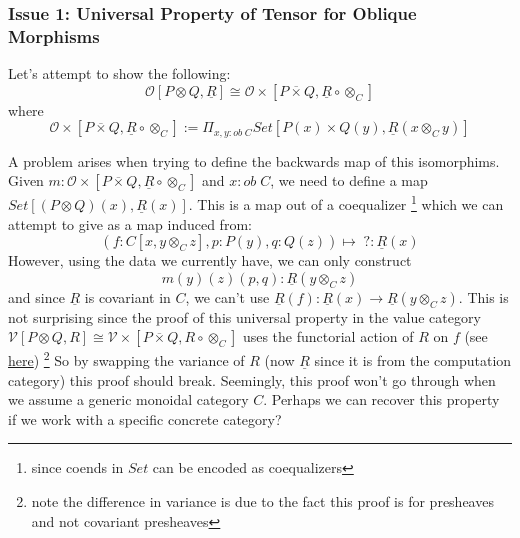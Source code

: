 \documentclass{article}
\begin{document}
\subsubsection{Issue 1: Universal Property of Tensor for Oblique Morphisms}
Let's attempt to show the following:
\[
  \mathcal{O}[P \otimes Q , \underline{R}] \cong \mathcal{O\times}[P \overline{\times} Q , \underline{R} \circ \otimes_C]  
\]
where 
\[
    \mathcal{O\times}[P \overline{\times} Q , \underline{R} \circ \otimes_C] 
    := \Pi_{x , y : ob \;C}Set[P(x)\times Q(y) , \underline{R}(x \otimes_C y)]
\]

A problem arises when trying to define the backwards map of this isomorphims. 
Given $m : \mathcal{O\times}[P \overline{\times} Q , \underline{R} \circ \otimes_C]$ and $x : ob \; C$, we need to define a map
$Set[(P \otimes Q)(x), \underline{R}(x)]$. This is a map out of a coequalizer 
\footnote{since coends in $Set$ can be encoded as coequalizers}
which we can attempt to give as a map induced from:
\[
    (f : C[x , y\otimes_C z] , p : P(y) , q : Q(z)) \mapsto \;? : \underline{R}(x)
\]
However, using the data we currently have, we can only construct
\[
    m(y)(z)(p,q) : \underline{R} (y \otimes_C z)    
\]
and since $\underline{R}$ is covariant in $C$, we can't use $\underline{R}(f) : \underline{R}(x) \rightarrow \underline{R}(y \otimes_C z)$.
This is not surprising since the proof of this universal property in the value category 
$\mathcal{V}[P \otimes Q , R] \cong \mathcal{V\times}[P \overline{\times} Q , R \circ \otimes_C]$
uses the functorial action of $R$ on $f$ 
(see \href{https://github.com/bond15/Bunched-CBPV/blob/d4de5ebe3a2a42499b24c13a8d2da7f3a2cc1b36/src/Data/BiDCC.agda#L120}{here})
\footnote{note the difference in variance is due to the fact this proof is for presheaves and not covariant presheaves}
So by swapping the variance of $R$ (now $\underline{R}$ since it is from the computation category) this proof should break.
Seemingly, this proof won't go through when we assume a generic monoidal category $C$. Perhaps we can recover this property if 
we work with a specific concrete category?
\end{document}
